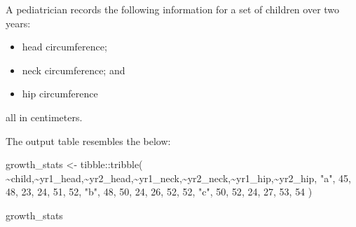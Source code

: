 \documentclass[
  letterpaper,
  DIV=11,
  numbers=noendperiod]{scrreprt}
\newenvironment{Shaded}{\begin{snugshade}}{\end{snugshade}}
\newcommand{\DecValTok}[1]{\textcolor[rgb]{0.68,0.00,0.00}{#1}}
\newcommand{\FunctionTok}[1]{\textcolor[rgb]{0.28,0.35,0.67}{#1}}
\newcommand{\NormalTok}[1]{\textcolor[rgb]{0.00,0.23,0.31}{#1}}
\newcommand{\OtherTok}[1]{\textcolor[rgb]{0.00,0.23,0.31}{#1}}
\newcommand{\SpecialCharTok}[1]{\textcolor[rgb]{0.37,0.37,0.37}{#1}}
\newcommand{\StringTok}[1]{\textcolor[rgb]{0.13,0.47,0.30}{#1}}
\providecommand{\tightlist}{%
  \setlength{\itemsep}{0pt}\setlength{\parskip}{0pt}}\usepackage{longtable,booktabs,array}
\begin{document}
\begin{tcolorbox}[enhanced jigsaw, titlerule=0mm, colback=white, left=2mm, breakable, opacitybacktitle=0.6, colbacktitle=quarto-callout-tip-color!10!white, colframe=quarto-callout-tip-color-frame, bottomtitle=1mm, opacityback=0, coltitle=black, arc=.35mm, toptitle=1mm, title=\textcolor{quarto-callout-tip-color}{\faLightbulb}\hspace{0.5em}{Practice}, leftrule=.75mm, toprule=.15mm, bottomrule=.15mm, rightrule=.15mm]

A pediatrician records the following information for a set of children
over two years:

\begin{itemize}
\tightlist
\item
  head circumference;
\item
  neck circumference; and
\item
  hip circumference
\end{itemize}

all in centimeters.

The output table resembles the below:

\begin{Shaded}
\begin{Highlighting}[]
\NormalTok{growth\_stats }\OtherTok{\textless{}{-}} 
\NormalTok{  tibble}\SpecialCharTok{::}\FunctionTok{tribble}\NormalTok{(}
    \SpecialCharTok{\textasciitilde{}}\NormalTok{child,}\SpecialCharTok{\textasciitilde{}}\NormalTok{yr1\_head,}\SpecialCharTok{\textasciitilde{}}\NormalTok{yr2\_head,}\SpecialCharTok{\textasciitilde{}}\NormalTok{yr1\_neck,}\SpecialCharTok{\textasciitilde{}}\NormalTok{yr2\_neck,}\SpecialCharTok{\textasciitilde{}}\NormalTok{yr1\_hip,}\SpecialCharTok{\textasciitilde{}}\NormalTok{yr2\_hip,}
       \StringTok{"a"}\NormalTok{,       }\DecValTok{45}\NormalTok{,       }\DecValTok{48}\NormalTok{,       }\DecValTok{23}\NormalTok{,       }\DecValTok{24}\NormalTok{,      }\DecValTok{51}\NormalTok{,      }\DecValTok{52}\NormalTok{,}
       \StringTok{"b"}\NormalTok{,       }\DecValTok{48}\NormalTok{,       }\DecValTok{50}\NormalTok{,       }\DecValTok{24}\NormalTok{,       }\DecValTok{26}\NormalTok{,      }\DecValTok{52}\NormalTok{,      }\DecValTok{52}\NormalTok{,}
       \StringTok{"c"}\NormalTok{,       }\DecValTok{50}\NormalTok{,       }\DecValTok{52}\NormalTok{,       }\DecValTok{24}\NormalTok{,       }\DecValTok{27}\NormalTok{,      }\DecValTok{53}\NormalTok{,      }\DecValTok{54}
\NormalTok{    )}

\NormalTok{growth\_stats}
\end{Highlighting}
\end{Shaded}


\end{tcolorbox}
\end{document}
